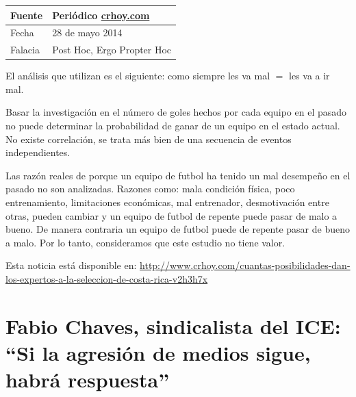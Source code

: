 \documentclass[times]{simauth}
\begin{document}
\newpage
\begin{table}[h!]
    \begin{tabular}{ll} 
        \toprule[1.5pt]
        Fuente & Periódico \href{crhow.com}{crhoy.com}\\
        \midrule[0.5pt]
        Fecha  & 28 de mayo 2014\\
        \midrule[0.5pt]
        Falacia & Post Hoc, Ergo Propter Hoc \\
        \bottomrule[1.5pt]
    \end{tabular} 
\end{table}

El análisis que utilizan es el siguiente: como siempre les va mal $=$ les va a ir mal.

Basar la investigación en el número de goles hechos por cada equipo en el pasado no puede determinar la probabilidad de ganar de un equipo en el estado actual. No existe correlación, se trata más bien de una secuencia de eventos independientes.

Las razón reales de porque un equipo de futbol ha tenido un mal desempeño en el pasado no son analizadas. Razones como: mala condición física, poco entrenamiento, limitaciones económicas, mal entrenador, desmotivación entre otras,  pueden cambiar y un equipo de futbol de repente puede pasar de malo a bueno. De manera contraria un equipo de futbol puede de repente pasar de bueno a malo. Por lo tanto, consideramos que este estudio no tiene valor. 

Esta noticia está disponible en: \href{http://www.crhoy.com/cuantas-posibilidades-dan-los-expertos-a-la-seleccion-de-costa-rica-v2h3h7x}{http://www.crhoy.com/cuantas-posibilidades-dan-los-expertos-a-la-seleccion-de-costa-rica-v2h3h7x}

\newpage
\section{Fabio Chaves, sindicalista del ICE: ``Si la agresión de medios sigue, habrá respuesta''}
\end{document}
